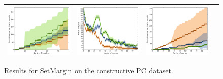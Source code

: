 \documentclass{article}
\renewcommand\[{\begin{equation}}
\renewcommand\]{\end{equation}}
\begin{document}
\begin{figure}[b]
{\begin{tabular}{cccc}
        \includegraphics[width=10em]{figures/pc_with_costs_normal_sparse_per_iter_time} &
        \includegraphics[width=10em]{figures/pc_with_costs_normal_sparse_per_query_loss} &
        \includegraphics[width=10em]{figures/pc_with_costs_normal_sparse_per_query_time}
        \\
        \hline
    \end{tabular}
    }
    \caption{\label{fig:pc} Results for {\sc SetMargin} on the constructive PC
    dataset.}
\end{figure}

\twocolumn
\end{document}
